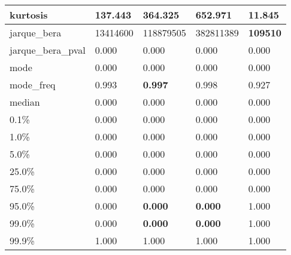 \begin{table}[H]
\begin{tabular}{|l|m{10em}|m{10em}|m{10em}|m{10em}|}
\hline kurtosis & 137.443 & 364.325 & \cellcolor[rgb]{0.9, 0.54, 0.52} 652.971 & \bfseries 11.845 \\
\hline jarque\_bera & 13414600 & 118879505 & \cellcolor[rgb]{0.9, 0.54, 0.52} 382811389 & \bfseries 109510 \\
\hline jarque\_bera\_pval & 0.000 & 0.000 & 0.000 & 0.000 \\
\hline mode & 0.000 & 0.000 & 0.000 & 0.000 \\
\hline mode\_freq & 0.993 & \bfseries 0.997 & 0.998 & \cellcolor[rgb]{0.9, 0.54, 0.52} 0.927 \\
\hline median & 0.000 & 0.000 & 0.000 & 0.000 \\
\hline 0.1\% & 0.000 & 0.000 & 0.000 & 0.000 \\
\hline 1.0\% & 0.000 & 0.000 & 0.000 & 0.000 \\
\hline 5.0\% & 0.000 & 0.000 & 0.000 & 0.000 \\
\hline 25.0\% & 0.000 & 0.000 & 0.000 & 0.000 \\
\hline 75.0\% & 0.000 & 0.000 & 0.000 & 0.000 \\
\hline 95.0\% & 0.000 & \bfseries 0.000 & \bfseries 0.000 & \cellcolor[rgb]{0.9, 0.54, 0.52} 1.000 \\
\hline 99.0\% & 0.000 & \bfseries 0.000 & \bfseries 0.000 & \cellcolor[rgb]{0.9, 0.54, 0.52} 1.000 \\
\hline 99.9\% & 1.000 & 1.000 & 1.000 & 1.000 \\
\hline
\end{tabular}
\end{table}
